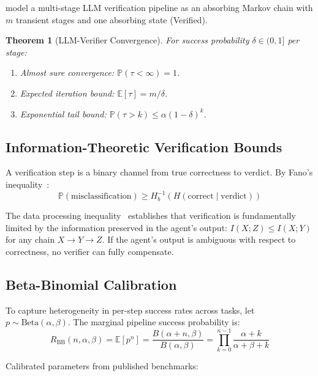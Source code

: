 \documentclass[11pt, a4paper, copyright]{googledeepmind}
\newtheorem{theorem}{Theorem}[section]
\newcommand{\E}{\mathbb{E}}
\newcommand{\Prob}{\mathbb{P}}
\begin{document}
\begin{appendices}
\citet{chen2024fourdelta} model a multi-stage LLM verification pipeline as an absorbing Markov chain with $m$ transient stages and one absorbing state (Verified).

\begin{theorem}[LLM-Verifier Convergence]
For success probability $\delta \in (0,1]$ per stage:
\begin{enumerate}
\item \emph{Almost sure convergence}: $\Prob(\tau < \infty) = 1$.
\item \emph{Expected iteration bound}: $\E[\tau] = m/\delta$.
\item \emph{Exponential tail bound}: $\Prob(\tau > k) \leq \alpha(1 - \delta)^k$.
\end{enumerate}
\end{theorem}

\subsection{Information-Theoretic Verification Bounds}

A verification step is a binary channel from true correctness to verdict.
By Fano's inequality~\citep{fano1961transmission}:
\begin{equation}
\Prob(\text{misclassification}) \geq H_b^{-1}(H(\text{correct} \mid \text{verdict}))
\end{equation}

The data processing inequality~\citep{cover2006elements} establishes that verification is fundamentally limited by the information preserved in the agent's output: $I(X; Z) \leq I(X; Y)$ for any chain $X \to Y \to Z$.
If the agent's output is ambiguous with respect to correctness, no verifier can fully compensate.

\subsection{Beta-Binomial Calibration}

To capture heterogeneity in per-step success rates across tasks, let $p \sim \text{Beta}(\alpha, \beta)$.
The marginal pipeline success probability is:
\begin{equation}
R_{\text{BB}}(n, \alpha, \beta) = \E[p^n] = \frac{B(\alpha + n, \beta)}{B(\alpha, \beta)} = \prod_{k=0}^{n-1} \frac{\alpha + k}{\alpha + \beta + k}
\end{equation}

Calibrated parameters from published benchmarks:


\end{appendices}
\end{document}
